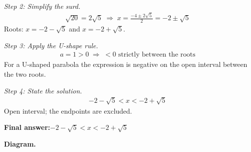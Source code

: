 \documentclass[11pt]{article}
\begin{document}
\textit{Step 2: Simplify the surd.}
\[\begin{gathered}
\sqrt{20} = 2\sqrt{5} \;\Longrightarrow\; x = \frac{-4 \pm 2\sqrt{5}}{2} = -2 \pm \sqrt{5}
\end{gathered}\]
Roots: \( x = -2 - \sqrt{5} \) and \( x = -2 + \sqrt{5} \).

\textit{Step 3: Apply the U-shape rule.}
\[\begin{gathered}
a = 1 > 0 \;\Longrightarrow\; < 0 \text{ strictly between the roots}
\end{gathered}\]
For a U-shaped parabola the expression is negative on the open interval between the two roots.

\textit{Step 4: State the solution.}
\[\begin{gathered}
-2 - \sqrt{5} < x < -2 + \sqrt{5}
\end{gathered}\]
Open interval; the endpoints are excluded.

\begin{answerbox}
\textbf{Final answer:}\quad \(\displaystyle -2 - \sqrt{5} < x < -2 + \sqrt{5}\)
\end{answerbox}
\textbf{Diagram.}
\end{document}
